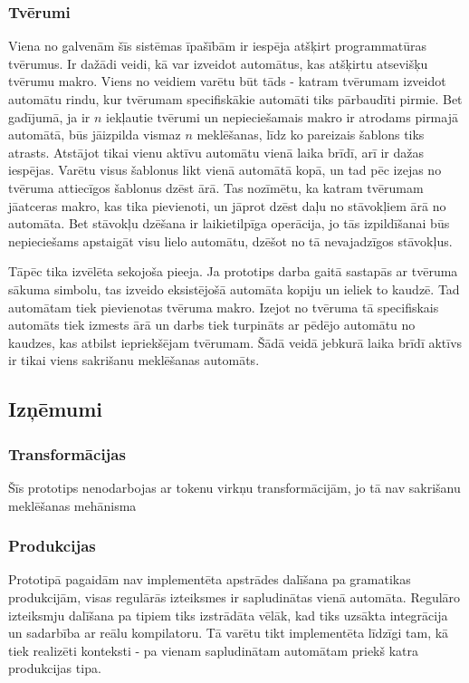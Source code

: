 \subsubsection{Tvērumi}

Viena no galvenām šīs sistēmas īpašībām ir iespēja atšķirt programmatūras tvērumus. Ir dažādi veidi, kā var izveidot automātus, kas atšķirtu atsevišķu tvērumu makro. Viens no veidiem varētu būt tāds - katram tvērumam izveidot automātu rindu, kur tvērumam specifiskākie automāti tiks pārbaudīti pirmie. Bet gadījumā, ja ir $n$ iekļautie tvērumi un nepieciešamais makro ir atrodams pirmajā automātā, būs jāizpilda vismaz $n$ meklēšanas, līdz ko pareizais šablons tiks atrasts. Atstājot tikai vienu aktīvu automātu vienā laika brīdī, arī ir dažas iespējas. Varētu visus šablonus likt vienā automātā kopā, un tad pēc izejas no tvēruma attiecīgos šablonus dzēst ārā. Tas nozīmētu, ka katram tvērumam jāatceras makro, kas tika pievienoti, un jāprot dzēst daļu no stāvokļiem ārā no automāta. Bet stāvokļu dzēšana ir laikietilpīga operācija, jo tās izpildīšanai būs nepieciešams apstaigāt visu lielo automātu, dzēšot no tā nevajadzīgos stāvokļus.

Tāpēc tika izvēlēta sekojoša pieeja. Ja prototips darba gaitā sastapās ar tvēruma sākuma simbolu, tas izveido eksistējošā automāta kopiju un ieliek to kaudzē. Tad automātam tiek pievienotas tvēruma makro. Izejot no tvēruma tā specifiskais automāts tiek izmests ārā un darbs tiek turpināts ar pēdējo automātu no kaudzes, kas atbilst iepriekšējam tvērumam. Šādā veidā jebkurā laika brīdī aktīvs ir tikai viens sakrišanu meklēšanas automāts.

\subsection{\label{subsec:solution_problems}Izņēmumi}


\subsubsection{Transformācijas}
Šīs prototips nenodarbojas ar tokenu virkņu transformācijām, jo tā nav sakrišanu meklēšanas mehānisma 

\subsubsection{Produkcijas}
Prototipā pagaidām nav implementēta apstrādes dalīšana pa gramatikas produkcijām, visas regulārās izteiksmes ir sapludinātas vienā automāta. Regulāro izteiksmju dalīšana pa tipiem tiks izstrādāta vēlāk, kad tiks uzsākta integrācija un sadarbība ar reālu kompilatoru. Tā varētu tikt implementēta līdzīgi tam, kā tiek realizēti konteksti - pa vienam sapludinātam automātam priekš katra produkcijas tipa.

